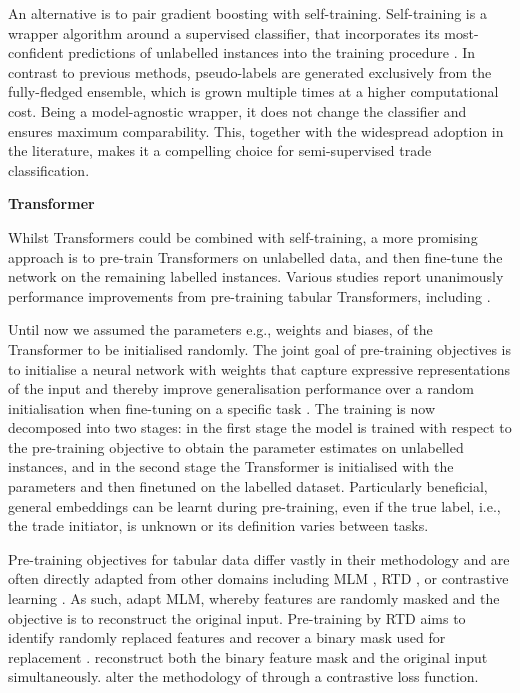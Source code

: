 An alternative is to pair gradient boosting with self-training. Self-training is a wrapper algorithm around a supervised classifier, that incorporates its most-confident predictions of unlabelled instances into the training procedure \autocite[][190]{yarowskyUnsupervisedWordSense1995}. In contrast to previous methods, pseudo-labels are generated exclusively from the fully-fledged ensemble, which is grown multiple times at a higher computational cost. Being a model-agnostic wrapper, it does not change the classifier and ensures maximum comparability. This, together with the widespread adoption in the literature, makes it a compelling choice for semi-supervised trade classification.

\textbf{Transformer}

Whilst Transformers could be combined with self-training, a more promising approach is to pre-train Transformers on unlabelled data, and then fine-tune the network on the remaining labelled instances. Various studies report unanimously performance improvements from pre-training tabular Transformers, including \textcites[][8]{somepalliSaintImprovedNeural2021}[][7]{huangTabTransformerTabularData2020}.

Until now we assumed the parameters e.g., weights and biases, of the Transformer to be initialised randomly. The joint goal of pre-training objectives is to initialise a neural network with weights that capture expressive representations of the input and thereby improve generalisation performance over a random initialisation when fine-tuning on a specific task \autocite[][12]{erhanWhyDoesUnsupervised}. The training is now decomposed into two stages: in the first stage the model is trained with respect to the pre-training objective to obtain the parameter estimates on unlabelled instances, and in the second stage the Transformer is initialised with the parameters and then finetuned on the labelled dataset. Particularly beneficial, general embeddings can be learnt during pre-training, even if the true label, i.e., the trade initiator, is unknown or its definition varies between tasks.

Pre-training objectives for tabular data differ vastly in their methodology and are often directly adapted from other domains including \gls{MLM} \autocite[][4174]{devlinBERTPretrainingDeep2019}, \gls{RTD} \autocite[][1--3]{clarkElectraPretrainingText2020}, or contrastive learning \autocite[][2]{chenSimpleFrameworkContrastive2020}.
As such, \textcite[][7]{huangTabTransformerTabularData2020} adapt \gls{MLM}, whereby features are randomly masked and the objective is to reconstruct the original input. Pre-training by \gls{RTD} aims to identify randomly replaced features and recover a binary mask used for replacement \autocite[][7]{huangTabTransformerTabularData2020}. \textcites[][3]{bahriSCARFSelfsupervisedContrastive2022}[][4--5]{yoonVIMEExtendingSuccess2020} reconstruct both the binary feature mask and the original input simultaneously. \textcite[][3]{somepalliSaintImprovedNeural2021} alter the methodology of \textcite[][4--5]{yoonVIMEExtendingSuccess2020} through a contrastive loss function.

